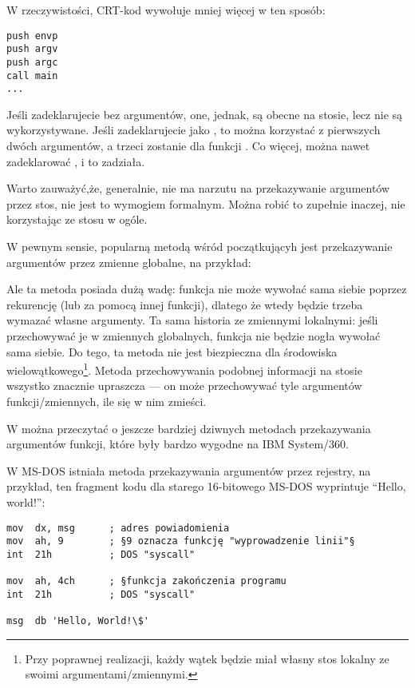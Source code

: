W rzeczywistości, \ac{CRT}-kod wywołuje \main mniej więcej w ten sposób:
	
\begin{lstlisting}[style=customasmx86]
push envp
push argv
push argc
call main
...
\end{lstlisting}

Jeśli zadeklarujecie \main bez argumentów, one, jednak, są obecne na stosie, lecz nie są wykorzystywane.
Jeśli zadeklarujecie \main jako , 
to można korzystać z pierwszych dwóch argumentów, a trzeci zostanie dla funkcji .
Co więcej, można nawet zadeklarować , i to zadziała.


Warto zauważyć,że, generalnie, nie ma narzutu na przekazywanie argumentów przez stos, nie jest to wymogiem formalnym.
Można robić to zupełnie inaczej, nie korzystając ze stosu w ogóle.

W pewnym sensie, popularną metodą wśród początkującyh jest przekazywanie argumentów przez zmienne globalne, na przykład:



Ale ta metoda posiada dużą wadę: funkcja  nie może wywołać sama siebie poprzez rekurencję (lub za pomocą innej funkcji),
dlatego że wtedy będzie trzeba wymazać własne argumenty.
Ta sama historia ze zmiennymi lokalnymi: jeśli przechowywać je w zmiennych globalnych, funkcja nie będzie nogła wywołać sama siebie.
Do tego, ta metoda nie jest biezpieczna dla środowiska wielowątkowego\footnote{Przy poprawnej realizacji,
każdy wątek będzie miał własny stos lokalny ze swoimi argumentami/zmiennymi.}.
Metoda przechowywania podobnej informacji na stosie wszystko znacznie upraszcza ---
on może przechowywać tyle argumentów funkcji/zmiennych,
ile się w nim zmieści.

W  można przeczytać o jeszcze bardziej dziwnych metodach przekazywania argumentów funkcji, które były bardzo wygodne na
 IBM System/360.


W MS-DOS istniała metoda przekazywania argumentów przez rejestry, na przykład, ten fragment kodu dla starego 16-bitowego MS-DOS
wyprintuje ``Hello, world!'':

\begin{lstlisting}[style=customasmx86]
mov  dx, msg      ; adres powiadomienia
mov  ah, 9        ; §9 oznacza funkcję "wyprowadzenie linii"§
int  21h          ; DOS "syscall"

mov  ah, 4ch      ; §funkcja zakończenia programu
int  21h          ; DOS "syscall"

msg  db 'Hello, World!\$'
\end{lstlisting}

